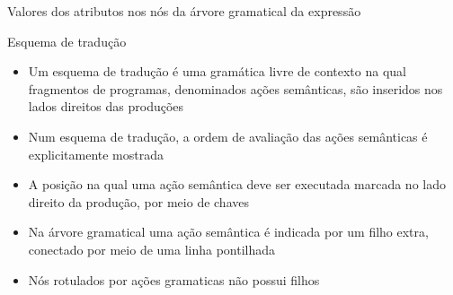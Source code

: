 \begin{frame}[fragile]{Valores dos atributos nos nós da árvore gramatical da expressão }

    \begin{figure}
        \centering

    \end{figure}

\end{frame}

\begin{frame}[fragile]{Esquema de tradução}

    \begin{itemize}
        \item Um esquema de tradução é uma gramática livre de contexto na qual fragmentos de programas, denominados ações semânticas, são inseridos nos lados
            direitos das produções

        \item Num esquema de tradução, a ordem de avaliação das ações semânticas é explicitamente mostrada

        \item A posição na qual uma ação semântica deve ser executada marcada no lado direito da produção, por meio de chaves

        \item Na árvore gramatical uma ação semântica é indicada por um filho extra, conectado por meio de uma linha pontilhada

        \item Nós rotulados por ações gramaticas não possui filhos
    \end{itemize}

\end{frame}

